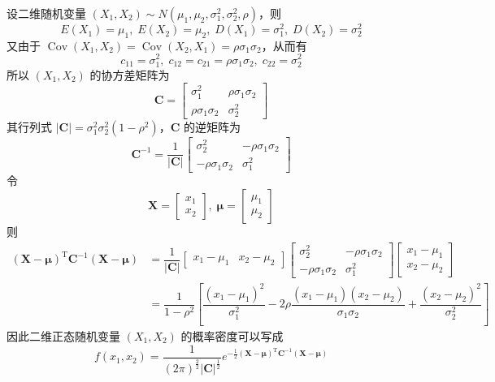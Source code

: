 设二维随机变量 $(X_1,X_2) \sim N(\mu_1,\mu_2,\sigma_1^2,\sigma_2^2,\rho)$，则
$$
E(X_1) = \mu_1, \; E(X_2) = \mu_2, \; D(X_1) = \sigma_1^2, \; D(X_2) = \sigma_2^2
$$
又由于 $\operatorname{Cov}(X_1,X_2) = \operatorname{Cov}(X_2,X_1) = \rho \sigma_1 \sigma_2$，从而有
$$
c_{11} = \sigma_1^2, \; c_{12} = c_{21} = \rho \sigma_1 \sigma_2, \; c_{22} = \sigma_2^2
$$
所以 $(X_1,X_2)$ 的协方差矩阵为
$$
\boldsymbol{C} = \begin{bmatrix}
    \sigma_1^2 & \rho \sigma_1 \sigma_2 \\
    \rho \sigma_1 \sigma_2 & \sigma_2^2
\end{bmatrix}
$$
其行列式 $|\boldsymbol{C}| = \sigma_1^2 \sigma_2^2 (1-\rho^2)$，$\boldsymbol{C}$ 的逆矩阵为
$$
\boldsymbol{C}^{-1} = \dfrac{1}{|\boldsymbol{C}|} \begin{bmatrix}
    \sigma_2^2 & -\rho \sigma_1 \sigma_2 \\
    -\rho \sigma_1 \sigma_2 & \sigma_1^2
\end{bmatrix}
$$
令
$$
\boldsymbol{X} = \begin{bmatrix}
    x_1 \\
    x_2
\end{bmatrix}, \;
\boldsymbol{\mu} = \begin{bmatrix}
    \mu_1 \\
    \mu_2
\end{bmatrix}
$$
则
$$
\begin{aligned}
    (\boldsymbol{X} - \boldsymbol{\mu})^{\text{T}} \boldsymbol{C}^{-1} (\boldsymbol{X} - \boldsymbol{\mu}) &= \dfrac{1}{|\boldsymbol{C}|}
    \begin{bmatrix}
        x_1-\mu_1 & x_2-\mu_2
    \end{bmatrix}
    \begin{bmatrix}
        \sigma_2^2 & -\rho \sigma_1 \sigma_2 \\
        -\rho \sigma_1 \sigma_2 & \sigma_1^2
    \end{bmatrix}
    \begin{bmatrix}
        x_1-\mu_1 \\
        x_2-\mu_2
    \end{bmatrix} \\
    &= \dfrac{1}{1-\rho^2} \left[ \dfrac{(x_1-\mu_1)^2}{\sigma_1^2} - 2\rho \dfrac{(x_1-\mu_1)(x_2-\mu_2)}{\sigma_1 \sigma_2} + \dfrac{(x_2-\mu_2)^2}{\sigma_2^2} \right]
\end{aligned}
$$
因此二维正态随机变量 $(X_1,X_2)$ 的概率密度可以写成
$$
f(x_1,x_2) = \dfrac{1}{(2\pi)^{\frac{2}{2}} |\boldsymbol{C}|^{\frac{1}{2}}} e^{-\frac{1}{2} (\boldsymbol{X} - \boldsymbol{\mu})^{\text{T}} \boldsymbol{C}^{-1} (\boldsymbol{X} - \boldsymbol{\mu})}
$$


